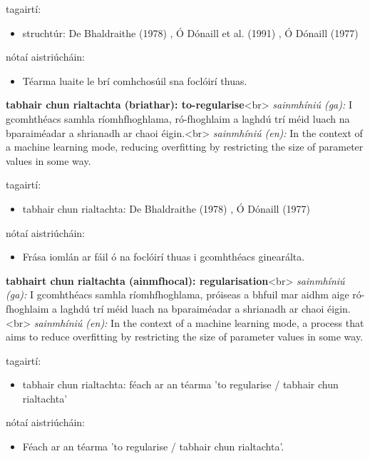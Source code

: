 \documentclass{article}
\begin{document}
tagairtí:
\begin{itemize}
	\item struchtúr: De Bhaldraithe (1978) \cite{de-bhaldraithe}, Ó Dónaill et al. (1991) \cite{focloir-beag}, Ó Dónaill (1977) \cite{odonaill}
\end{itemize}

nótaí aistriúcháin:
\begin{itemize}
	\item Téarma luaite le brí comhchosúil sna foclóirí thuas.
\end{itemize}


\textbf{tabhair chun rialtachta (briathar): to-regularise}<br>
\textit{sainmhíniú (ga):} I gcomhthéacs samhla ríomhfhoghlama, ró-fhoghlaim a laghdú trí méid luach na bparaiméadar a shrianadh ar chaoi éigin.<br>
\textit{sainmhíniú (en):} In the context of a machine learning mode, reducing overfitting by restricting the size of parameter values in some way.

tagairtí:
\begin{itemize}
	\item tabhair chun rialtachta: De Bhaldraithe (1978) \cite{de-bhaldraithe}, Ó Dónaill (1977) \cite{odonaill}
\end{itemize}

nótaí aistriúcháin:
\begin{itemize}
	\item Frása iomlán ar fáil ó na foclóirí thuas i gcomhthéacs ginearálta.
\end{itemize}


\textbf{tabhairt chun rialtachta (ainmfhocal): regularisation}<br>
\textit{sainmhíniú (ga):} I gcomhthéacs samhla ríomhfhoghlama, próiseas a bhfuil mar aidhm aige ró-fhoghlaim a laghdú trí méid luach na bparaiméadar a shrianadh ar chaoi éigin.<br>
\textit{sainmhíniú (en):} In the context of a machine learning mode, a process that aims to reduce overfitting by restricting the size of parameter values in some way.

tagairtí:
\begin{itemize}
	\item tabhair chun rialtachta: féach ar an téarma 'to regularise / tabhair chun rialtachta'
\end{itemize}

nótaí aistriúcháin:
\begin{itemize}
	\item Féach ar an téarma 'to regularise / tabhair chun rialtachta'.
\end{itemize}
\end{document}
